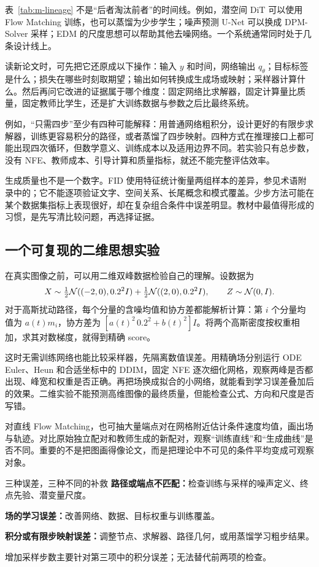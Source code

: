 表~\ref{tab:m-lineage} 不是“后者淘汰前者”的时间线。例如，潜空间 DiT 可以使用 Flow Matching 训练，也可以蒸馏为少步学生；噪声预测 U-Net 可以换成 DPM-Solver 采样；EDM 的尺度思想可以帮助其他去噪网络。一个系统通常同时处于几条设计线上。

读新论文时，可先把它还原成以下操作：输入 $y$ 和时间，网络输出 $q_\theta$；目标标签是什么；损失在哪些时刻取期望；输出如何转换成生成场或映射；采样器计算什么。然后再问它改进的证据属于哪个维度：固定网络比求解器，固定计算量比质量，固定教师比学生，还是扩大训练数据与参数之后比最终系统。

例如，“只需四步”至少有四种可能解释：用普通网络粗积分，设计更好的有限步求解器，训练更容易积分的路径，或者蒸馏了四步映射。四种方式在推理接口上都可能出现四次循环，但数学意义、训练成本以及适用边界不同。若实验只有总步数，没有 NFE、教师成本、引导计算和质量指标，就还不能完整评估效率。

生成质量也不是一个数字。FID 使用特征统计衡量两组样本的差异，参见术语附录中的；它不能逐项验证文字、空间关系、长尾概念和模式覆盖。少步方法可能在某个数据集指标上表现很好，却在复杂组合条件中误差明显。教材中最值得形成的习惯，是先写清比较问题，再选择证据。

\subsection{一个可复现的二维思想实验}

在真实图像之前，可以用二维双峰数据检验自己的理解。设数据为
\[
 X\sim\tfrac12\mathcal{N}((-2,0),0.2^2I)
       +\tfrac12\mathcal{N}((2,0),0.2^2I),
\qquad Z\sim\mathcal{N}(0,I).
\]
对于高斯扰动路径，每个分量的含噪均值和协方差都能解析计算：第 $i$ 个分量均值为 $a(t)m_i$，协方差为
$[a(t)^2\,0.2^2+b(t)^2]I$。将两个高斯密度按权重相加，求其对数梯度，就得到精确 score。

这时无需训练网络也能比较采样器，先隔离数值误差。用精确场分别运行 ODE Euler、Heun 和合适坐标中的 DDIM，固定 NFE 逐次细化网格，观察两峰是否都出现、峰宽和权重是否正确。再把场换成拟合的小网络，就能看到学习误差叠加后的效果。二维实验不能预测高维图像的最终质量，但能检查公式、方向和尺度是否写错。

对直线 Flow Matching，也可抽大量端点对在网格附近估计条件速度均值，画出场与轨迹。对比原始独立配对和教师生成的新配对，观察“训练直线”和“生成曲线”是否不同。重要的不是把图画得像论文，而是把理论中不可见的条件平均变成可观察对象。

\begin{keybox}{三种误差，三种不同的补救}
\textbf{路径或端点不匹配：}检查训练与采样的噪声定义、终点先验、潜变量尺度。

\textbf{场的学习误差：}改善网络、数据、目标权重与训练覆盖。

\textbf{积分或有限步映射误差：}调整节点、求解器、路径几何，或用蒸馏学习粗步结果。

增加采样步数主要针对第三项中的积分误差；无法替代前两项的检查。
\end{keybox}

